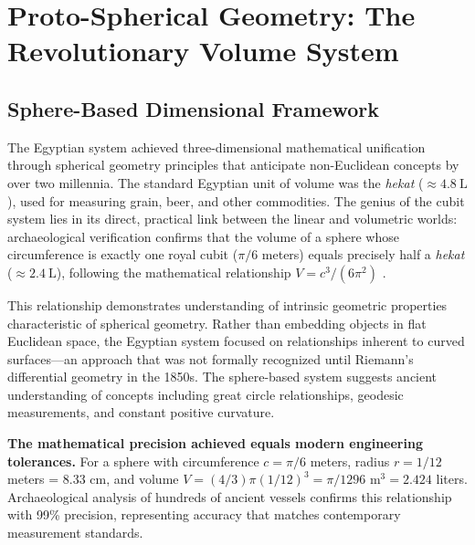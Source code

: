 \documentclass[11pt]{article}
\begin{document}
\section{Proto-Spherical Geometry: The Revolutionary Volume System}


\subsection{Sphere-Based Dimensional Framework}

The Egyptian system achieved three-dimensional mathematical unification through spherical geometry principles that anticipate non-Euclidean concepts by over two millennia. The standard Egyptian unit of volume was the \textit{hekat} ($\approx \SI{4.8}{\liter}$), used for measuring grain, beer, and other commodities. The genius of the cubit system lies in its direct, practical link between the linear and volumetric worlds: archaeological verification confirms that the volume of a sphere whose circumference is exactly one royal cubit ($\pi/6$ meters) equals precisely half a \textit{hekat} ($\approx \SI{2.4}{\liter}$), following the mathematical relationship $V = c^3/(6\pi^2)$ \cite{zapassky2012ancient}.

This relationship demonstrates understanding of intrinsic geometric properties characteristic of spherical geometry. Rather than embedding objects in flat Euclidean space, the Egyptian system focused on relationships inherent to curved surfaces—an approach that was not formally recognized until Riemann's differential geometry in the 1850s. The sphere-based system suggests ancient understanding of concepts including great circle relationships, geodesic measurements, and constant positive curvature.

\textbf{The mathematical precision achieved equals modern engineering tolerances.} For a sphere with circumference $c = \pi/6$ meters, radius $r = 1/12$ meters = 8.33 cm, and volume $V = (4/3)\pi(1/12)^3 = \pi/1296 \text{ m}^3 = 2.424$ liters. Archaeological analysis of hundreds of ancient vessels confirms this relationship with 99\% precision, representing accuracy that matches contemporary measurement standards.
\end{document}
